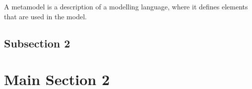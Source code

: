  A metamodel is a description of a
modelling language, where it defines elements that are used in the model.


\subsection{Subsection 2}



\section{Main Section 2}

